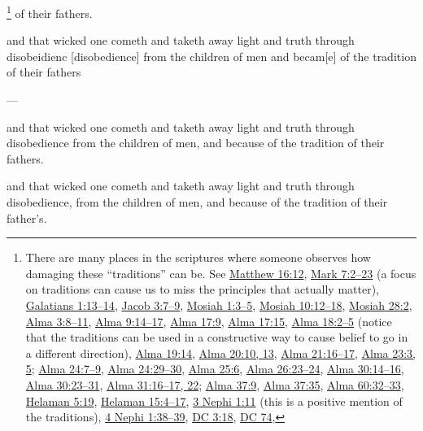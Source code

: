 			\footnote{%
				There are many places in the scriptures where someone observes how damaging these ``traditions'' can be. See \hyperref[MATTHEW-16-12]{Matthew 16:12}, \hyperref[MARK-7-3]{Mark 7:2--23} (a focus on traditions can cause us to miss the principles that actually matter), \hyperref[GALATIANS-1-13]{Galatians 1:13--14}, \hyperref[JACOB-3-7]{Jacob 3:7--9}, \hyperref[MOSIAH-1-3]{Mosiah 1:3--5}, \hyperref[MOSIAH-10-12]{Mosiah 10:12--18}, \hyperref[MOSIAH-28-2]{Mosiah 28:2}, \hyperref[ALMA-3-8]{Alma 3:8--11}, \hyperref[ALMA-9-14]{Alma 9:14--17}, \hyperref[ALMA-17-9]{Alma 17:9}, \hyperref[ALMA-17-15]{Alma 17:15}, \hyperref[ALMA-18-2]{Alma 18:2--5} (notice that the traditions can be used in a constructive way to cause belief to go in a different direction), \hyperref[ALMA-19-14]{Alma 19:14}, \hyperref[ALMA-20-10]{Alma 20:10, 13}, \hyperref[ALMA-21-16]{Alma 21:16--17}, \hyperref[ALMA-23-3]{Alma 23:3, 5}; \hyperref[ALMA-24-7]{Alma 24:7--9}, \hyperref[ALMA-24-29]{Alma 24:29--30}, \hyperref[ALMA-25-6]{Alma 25:6}, \hyperref[ALMA-26-23]{Alma 26:23--24}, \hyperref[ALMA-30-14]{Alma 30:14--16}, \hyperref[ALMA-30-14]{Alma 30:23--31}, \hyperref[ALMA-31-16]{Alma 31:16--17, 22}; \hyperref[ALMA-37-9]{Alma 37:9}, \hyperref[ALMA-37-35]{Alma 37:35}, \hyperref[ALMA-60-32]{Alma 60:32--33}, \hyperref[HELAMAN-5-19]{Helaman 5:19}, \hyperref[HELAMAN-15-4]{Helaman 15:4--17}, \hyperref[3NEPHI-1-11]{3 Nephi 1:11} (this is a positive mention of the traditions), \hyperref[4NEPHI-1-38]{4 Nephi 1:38--39}, \hyperref[DC3-18]{DC 3:18}, \hyperref[DC74]{DC 74}, 
				}
		of their fathers.

		\begin{framed}
		\scriptsize
			\begin{compactdesc}
				\item[JSP] and that wicked one cometh and taketh away light and truth through disobeidienc [disobedience] from the children of men and becam[e] of the tradition of their fathers
				\item[BC] ---
				\item[RB2] and that wicked one cometh and taketh away light and truth through disobedience from the children of men, and because of the tradition of their fathers. 
				\item[RB1] and that wicked one cometh and taketh away light and truth through disobedience, from the children of men, and because of the tradition of their father's. 
			\end{compactdesc}
		\end{framed}

